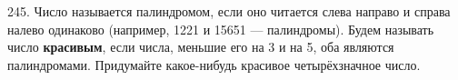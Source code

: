 245. Число называется палиндромом, если оно читается слева направо и справа налево одинаково (например, 1221 и 15651 --- палиндромы). Будем называть число {\bf красивым}, если числа, меньшие его на 3 и на 5, оба являются палиндромами. Придумайте какое-нибудь красивое четырёхзначное число.\\
